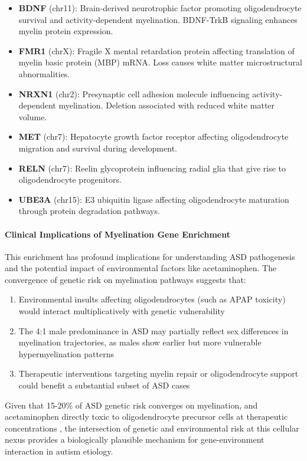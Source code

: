 \documentclass[12pt]{article}
\begin{document}
\begin{itemize}
\item \textbf{BDNF} (chr11): Brain-derived neurotrophic factor promoting oligodendrocyte survival and activity-dependent myelination. BDNF-TrkB signaling enhances myelin protein expression.
\item \textbf{FMR1} (chrX): Fragile X mental retardation protein affecting translation of myelin basic protein (MBP) mRNA. Loss causes white matter microstructural abnormalities.
\item \textbf{NRXN1} (chr2): Presynaptic cell adhesion molecule influencing activity-dependent myelination. Deletion associated with reduced white matter volume.
\item \textbf{MET} (chr7): Hepatocyte growth factor receptor affecting oligodendrocyte migration and survival during development.
\item \textbf{RELN} (chr7): Reelin glycoprotein influencing radial glia that give rise to oligodendrocyte progenitors.
\item \textbf{UBE3A} (chr15): E3 ubiquitin ligase affecting oligodendrocyte maturation through protein degradation pathways.
\end{itemize}

\paragraph{Clinical Implications of Myelination Gene Enrichment}
This enrichment has profound implications for understanding ASD pathogenesis and the potential impact of environmental factors like acetaminophen. The convergence of genetic risk on myelination pathways suggests that:

\begin{enumerate}
\item Environmental insults affecting oligodendrocytes (such as APAP toxicity) would interact multiplicatively with genetic vulnerability
\item The 4:1 male predominance in ASD may partially reflect sex differences in myelination trajectories, as males show earlier but more vulnerable hypermyelination patterns
\item Therapeutic interventions targeting myelin repair or oligodendrocyte support could benefit a substantial subset of ASD cases
\end{enumerate}

Given that 15-20\% of ASD genetic risk converges on myelination, and acetaminophen directly toxic to oligodendrocyte precursor cells at therapeutic concentrations \citep{perez2012}, the intersection of genetic and environmental risk at this cellular nexus provides a biologically plausible mechanism for gene-environment interaction in autism etiology.
\end{document}

